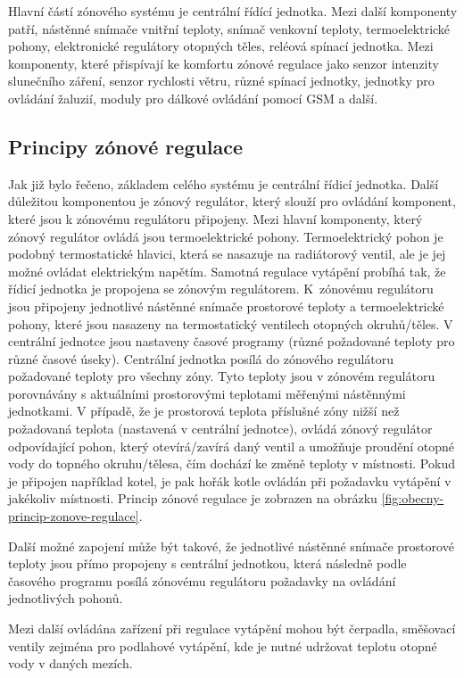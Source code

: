 Hlavní částí zónového systému je centrální řídící jednotka. Mezi další komponenty patří, nástěnné snímače vnitřní teploty, snímač venkovní teploty, termoelektrické pohony, elektronické regulátory otopných těles, reléová spínací jednotka. Mezi komponenty, které přispívají ke komfortu zónové regulace jako senzor intenzity slunečního záření, senzor rychlosti větru, různé spínací jednotky, jednotky pro ovládání žaluzií, moduly pro dálkové ovládání pomocí GSM a další.
\subsection{Principy zónové regulace}
Jak již bylo řečeno, základem celého systému je centrální řídicí jednotka. Další důležitou komponentou je zónový regulátor, který slouží pro ovládání komponent, které jsou k zónovému regulátoru připojeny. Mezi hlavní komponenty, který zónový regulátor ovládá jsou termoelektrické pohony. Termoelektrický pohon je podobný termostatické hlavici, která se nasazuje na radiátorový ventil, ale je jej možné ovládat elektrickým napětím. Samotná regulace vytápění probíhá tak, že řídicí jednotka je propojena se zónovým regulátorem. K~zónovému regulátoru jsou připojeny jednotlivé nástěnné snímače  prostorové teploty a termoelektrické pohony, které jsou nasazeny na termostatický ventilech otopných okruhů/těles. V centrální jednotce jsou nastaveny časové programy (různé požadované teploty pro různé časové úseky). Centrální jednotka posílá do zónového regulátoru požadované teploty pro všechny zóny. Tyto  teploty jsou v zónovém regulátoru porovnávány s aktuálními prostorovými teplotami měřenými nástěnnými jednotkami. V případě, že je prostorová teplota příslušné zóny nižší než požadovaná teplota (nastavená v centrální jednotce), ovládá zónový regulátor odpovídající pohon, který otevírá/zavírá daný ventil a umožňuje proudění otopné vody do topného okruhu/tělesa, čím dochází ke změně teploty v místnosti. Pokud je připojen například kotel, je pak hořák kotle ovládán při požadavku vytápění v jakékoliv místnosti. Princip zónové regulace je zobrazen na obrázku \ref{fig:obecny-princip-zonove-regulace}.

Další možné zapojení může být takové, že jednotlivé nástěnné snímače prostorové teploty jsou přímo propojeny s centrální jednotkou, která následně podle časového programu posílá zónovému regulátoru požadavky na ovládání jednotlivých pohonů. 

Mezi další ovládána zařízení při regulace vytápění mohou být čerpadla, směšovací ventily zejména pro podlahové vytápění, kde je nutné udržovat teplotu otopné vody v daných mezích.

